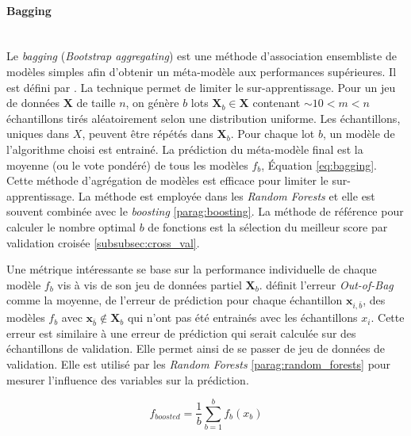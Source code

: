 \paragraph{Bagging}\mbox{\label{parag:bagging}} \\
Le \textit{bagging} (\textit{\emph{B}ootstrap \emph{agg}regat\emph{ing}}) est une méthode d'association ensembliste de modèles simples afin d'obtenir un méta-modèle aux performances supérieures.
Il est défini par \citeauthor{breiman_bagging_1996} \cite{breiman_bagging_1996}.
La technique permet de limiter le sur-apprentissage.
Pour un jeu de données $\mathbf{X}$ de taille $n$, on génère $b$ lots $\mathbf{X}_b \in \mathbf{X}$ contenant $\sim 10 < m < n$ échantillons tirés aléatoirement selon une distribution uniforme.
Les échantillons, uniques dans $X$, peuvent être répétés dans $\mathbf{X}_b$.
Pour chaque lot $b$, un modèle de l'algorithme choisi est entrainé.
La prédiction du méta-modèle final est la moyenne (ou le vote pondéré) de tous les modèles $f_b$, Équation \ref{eq:bagging}.
Cette méthode d'agrégation de modèles est efficace pour limiter le sur-apprentissage.
La méthode est employée dans les \textit{Random Forests} et elle est souvent combinée avec le \textit{boosting} \ref{parag:boosting}.
La méthode de référence pour calculer le nombre optimal $b$ de fonctions est la sélection du meilleur score par validation croisée \ref{subsubsec:cross_val}.

Une métrique intéressante se base sur la performance individuelle de chaque modèle $f_b$ vis à vis de son jeu de données partiel $\mathbf{X}_b$.
\citeauthor{breiman_bagging_1996} \cite{breiman_bagging_1996} définit l'erreur \textit{Out-of-Bag} comme la moyenne, de l'erreur de prédiction pour chaque échantillon $\mathbf{x}_{i,\bar{b}}$, des modèles $f_b$ avec $ \mathbf{x}_{\bar{b}} \notin \mathbf{X}_b$ qui n'ont pas été entrainés avec les échantillons $x_i$.
Cette erreur est similaire à une erreur de prédiction qui serait calculée sur des échantillons de validation.
Elle permet ainsi de se passer de jeu de données de validation.
Elle est utilisé par les \textit{Random Forests} \ref{parag:random_forests} pour mesurer l'influence des variables sur la prédiction.

\begin{equation} \label{eq:bagging}
f_{boosted} = \frac{1}{b} \sum_{b=1}^{b} f_{b}\left(x_b\right)
\end{equation}

